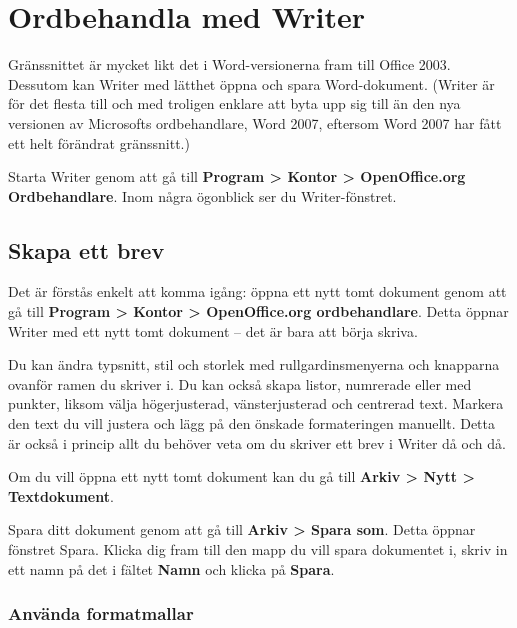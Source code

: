 \documentclass[a4paper,final]{memoir} %
\begin{document}

\section{Ordbehandla med Writer}


Gränssnittet är mycket likt det i Word-versionerna fram till Office 2003. Dessutom kan Writer med lätthet öppna och spara Word-dokument. (Writer är för det flesta till och med troligen enklare att byta upp sig till än den nya versionen av Microsofts ordbehandlare, Word 2007, eftersom Word 2007 har fått ett helt förändrat gränssnitt.)

Starta Writer genom att gå till \textbf{Program \textgreater{} Kontor \textgreater{} OpenOffice.org Ordbehandlare}. Inom några ögonblick ser du Writer-fönstret.

\subsection{Skapa ett brev}


Det är förstås enkelt att komma igång: öppna ett nytt tomt dokument genom att gå till \textbf{Program \textgreater{} Kontor \textgreater{} OpenOffice.org ordbehandlare}. Detta öppnar Writer med ett nytt tomt dokument -- det är bara att börja skriva. 

Du kan ändra typsnitt, stil och storlek med rullgardinsmenyerna och knapparna ovanför ramen du skriver i. Du kan också skapa listor, numrerade eller med punkter, liksom välja högerjusterad, vänsterjusterad och centrerad text. Markera den text du vill justera och lägg på den önskade formateringen manuellt. Detta är också i princip allt du behöver veta om du skriver ett brev i Writer då och då.

Om du vill öppna ett nytt tomt dokument kan du gå till \textbf{Arkiv \textgreater{} Nytt \textgreater{} Textdokument}.

Spara ditt dokument genom att gå till  \textbf{Arkiv \textgreater{} Spara som}. Detta öppnar fönstret Spara. Klicka dig fram till den mapp du vill spara dokumentet i, skriv in ett namn på det i fältet \textbf{Namn} och klicka på \textbf{Spara}.

\subsubsection{Använda formatmallar}
\end{document}

